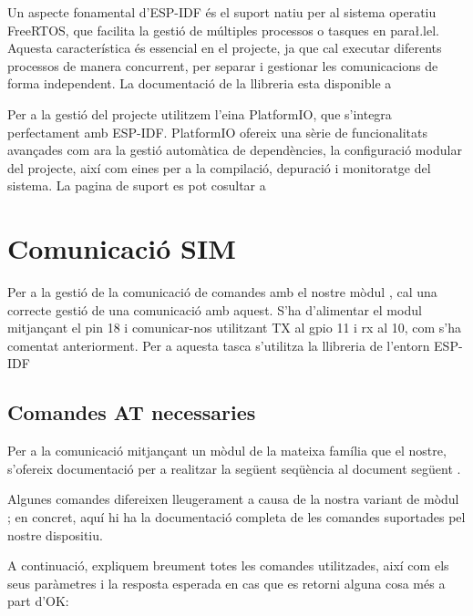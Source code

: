 \documentclass{tfgitic}[2024/07/01]
\begin{document}
Un aspecte fonamental d'ESP-IDF és el suport natiu per al sistema operatiu FreeRTOS, que facilita la gestió de múltiples processos o tasques en para\l.lel. Aquesta característica és essencial en el 
projecte, ja que cal executar diferents processos de manera concurrent, per separar i gestionar les comunicacions de forma independent. La documentació de la llibreria esta disponible a \cite{freertos}

Per a la gestió del projecte utilitzem l'eina PlatformIO, que s'integra perfectament amb ESP-IDF. PlatformIO ofereix una sèrie de funcionalitats avançades com ara la gestió automàtica de dependències, 
la configuració modular del projecte, així com eines per a la compilació, depuració i monitoratge del sistema. La pagina de suport es pot cosultar a \cite{platformio}

\section{Comunicació SIM}

Per a la gestió de la comunicació de comandes  amb el nostre mòdul , cal una correcte gestió de una comunicació  amb aquest. S'ha d'alimentar el modul mitjançant 
el pin  18 i comunicar-nos utilitzant TX al gpio 11 i rx al 10, com s'ha comentat anteriorment. Per a aquesta tasca s'utilitza la llibreria de l'entorn ESP-IDF \cite{espressif_uart}

\subsection{Comandes AT necessaries}

Per a la comunicació  mitjançant un mòdul  de la mateixa família que el nostre, s'ofereix documentació per a realitzar la següent seqüència al document següent \cite{simcom_mqtt}.

Algunes comandes difereixen lleugerament a causa de la nostra variant de mòdul ; en concret, aquí \cite{simcom_at} hi ha la documentació completa de les comandes  suportades pel nostre 
dispositiu.

A continuació, expliquem breument totes les comandes utilitzades, així com els seus paràmetres i la resposta esperada en cas que es retorni alguna cosa més a part d'OK:
\end{document}
